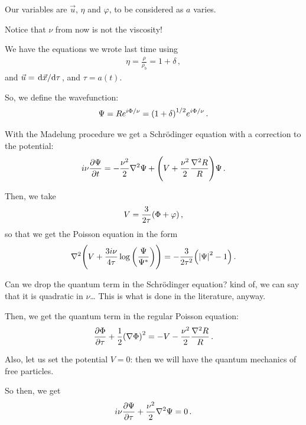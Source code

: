 \documentclass[main.tex]{subfiles}
\begin{document}

Our variables are \(\vec{u}\), \(\eta \) and \(\varphi \), to be considered as \(a\) varies. 

Notice that \(\nu \) from now is not the viscosity!

We have the equations we wrote last time using 
%
\begin{align}
\eta = \frac{\rho}{\rho_{b}} = 1+ \delta 
\,,
\end{align}
%
and \(\vec{u} = \dv*{\vec{x}}{\tau }\), and \(\tau = a(t)\).

So, we define the wavefunction: 
%
\begin{align}
\Psi = R e^{i \Phi  / \nu } = \qty(1 + \delta )^{1/2} e^{i \Phi / \nu }
\,.
\end{align}

With the Madelung procedure we get a Schrödinger equation with a correction to the potential: 
%
\begin{align}
i \nu \pdv{\Psi }{t} = - \frac{\nu^2}{2}  \nabla^2 \Psi 
+ \qty(V + \frac{\nu^2}{2} \frac{\nabla^2 R}{R})\Psi 
\,.
\end{align}

Then, we take 
%
\begin{align}
V = \frac{3}{2 \tau } \qty(\Phi + \varphi ) 
\,,
\end{align}
%
so that we get the Poisson equation in the form 
%
\begin{align}
\nabla^2 \qty(V + \frac{3i\nu}{4 \tau } \log \qty( \frac{\Psi}{\Psi^{*}} )) = - \frac{3}{2 \tau^2} \qty(\abs{\Psi  }^2 - 1)
\,.
\end{align}

Can we drop the quantum term in the Schrödinger equation? kind of, we can say that it is quadratic in \(\nu \)\dots
This is what is done in the literature, anyway.

Then, we get the quantum term in the regular Poisson equation:
%
\begin{align}
\pdv{\Phi }{\tau } + \frac{1}{2} \qty(\nabla \Phi )^2 = - V - \frac{\nu^2}{2} \frac{\nabla^2 R}{R }
\,.
\end{align}

Also, let us set the potential \(V = 0\): then we will have the quantum mechanics of free particles. 

So then, we get 
%
\begin{align}
i \nu \pdv{\Psi }{ \tau } + \frac{\nu^2}{2} \nabla^2 \Psi  = 0 
\,.
\end{align}
\end{document}
